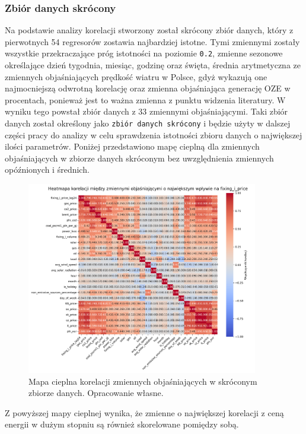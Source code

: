 \subsubsection{Zbiór danych skrócony}
\label{sec:shortened_dataset}
Na podstawie analizy korelacji stworzony został skrócony zbiór danych, który z pierwotnych 54 regresorów zostawia najbardziej istotne. Tymi zmiennymi zostały wszystkie przekraczające próg istotności na poziomie \texttt{0.2}, zmienne sezonowe określające dzień tygodnia, miesiąc, godzinę oraz święta, średnia arytmetyczna ze zmiennych objaśniających prędkość wiatru w Polsce, gdyż wykazują one najmocniejszą odwrotną korelację oraz zmienna objaśniająca generację OZE w procentach, ponieważ jest to ważna zmienna z punktu widzenia literatury. W wyniku tego powstał zbiór danych z 33 zmiennymi objaśniającymi. Taki zbiór danych został określony jako \texttt{zbiór danych skrócony} i będzie użyty w dalszej części pracy do analizy w celu sprawdzenia istotności zbioru danych o największej ilości parametrów. Poniżej przedstawiono mapę cieplną dla zmiennych objaśniających w zbiorze danych skróconym bez uwzględnienia zmiennych opóźnionych i średnich. 

\begin{figure}[H]
    \centering
    \includegraphics[width=0.9\textwidth]{../plots/heatmap_short_db_features.png}
    \caption{Mapa cieplna korelacji zmiennych objaśniających w skróconym zbiorze danych. Opracowanie własne.}
    \label{fig:heatmap_shortened_dataset}
\end{figure}

Z powyższej mapy cieplnej wynika, że zmienne o największej korelacji z ceną energii w dużym stopniu są również skorelowane pomiędzy sobą. 

